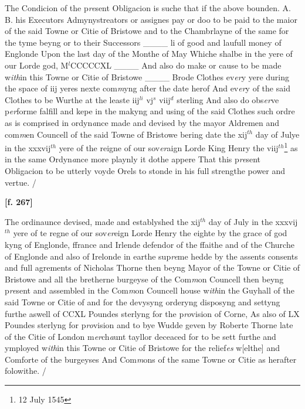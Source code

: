 \documentclass[a4paper,12pt]{article}
\begin{document}
The Condicion of the p\textit{re}sent Obligacion is suche that if the above bounden. A. B. his Executors Admynystreators or assignes pay or doo to be paid to the maior of the said Towne or Citie of Bristowe and to the Chambrlayne of the same for the tyme beyng or to their Successors 
\_\_\_\_ li of good and laufull money of Englonde Upon the last day of the Monthe of May Whiche shalbe in the yere of our Lorde god, M$^{l}$CCCCCXL \_\_\_\_ And also do make or cause to be made w\textit{ith}in this Towne or Citie of Bristowe \_\_\_\_ Brode Clothes ev\textit{er}y yere during the space of iij yeres nexte com\textit{m}yng after the date herof And ev\textit{er}y of the said Clothes to be Wurthe at the leaste iij$^{li}$ vj$^{s}$ viij$^{d}$ sterling  And also do obs\textit{er}ve p\textit{er}forme falfill and kepe in the makyng and using of the said Clothes such ordre as is comprised in ordyn\textit{a}nce made and devised by the mayor Aldremen and com\textit{m}en Councell of the said Towne of Bristowe bering date the xij$^{th}$ day of Julye in the xxxvij$^{th}$ yere of the reigne of our sov\textit{er}aign Lorde King Henry the viij$^{th}$\footnote{12 July 1545} as in the same Ordyn\textit{a}nce more playnly it dothe appere That this p\textit{re}sent Obligacion to be utterly voyde Orels to stonde in his full strengthe power and vertue. /

\textbf{[f. 267]}

The ordinaunce devised, made and establyshed the xij$^{th}$ day of July in the xxxvij$^{th}$ yere of te regne of our sov\textit{er}eign Lorde Henry the eighte by the grace of god kyng of Englonde, ffrance and Irlende defendor of the ffaithe and of the Churche of Englonde and also of Irelonde in earthe sup\textit{re}me hedde by the assents consents and full agrements of Nicholas Thorne then beyng Mayor of the Towne or Citie of Bristowe and all the bretherne burgeyse of the Com\textit{m}on Councell then beyng p\textit{re}sent and assembled in the Com\textit{m}on Councell house w\textit{ith}in the Guyhall of the said Towne or Citie of and for the devysyng orderyng disposyng and settyng furthe aswell of CCXL Poundes sterlyng for the p\textit{ro}vision of Corne, As also of LX Poundes sterlyng for p\textit{ro}vision and to bye Wudde geven by Roberte Thorne late of the Citie of London m\textit{er}ch\textit{a}unt tayllor deceaced for to be sett furthe and ymployed w\textit{ith}in this Towne or Citie of Bristowe for the relief\textit{es} w[elthe] and Comforte of the burgeyses And Com\textit{m}ons of the same Towne or Citie as herafter folowithe. /
\end{document}
